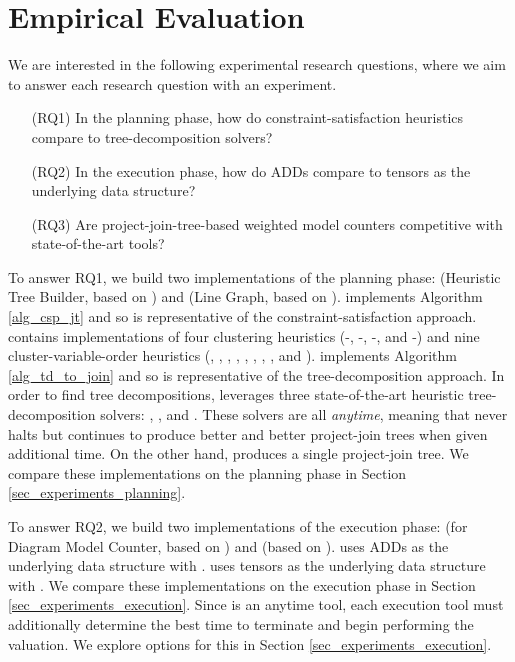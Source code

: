 \section{Empirical Evaluation}
\label{sec_experiments}

We are interested in the following experimental research questions, where we aim to answer each research question with an experiment.
\begin{itemize}
    \item[(RQ1)] In the planning phase, how do constraint-satisfaction heuristics compare to tree-decomposition solvers?
    \item[(RQ2)] In the execution phase, how do ADDs compare to tensors as the underlying data structure?
    \item[(RQ3)] Are project-join-tree-based weighted model counters competitive with state-of-the-art tools?
\end{itemize}

To answer RQ1, we build two implementations of the planning phase: \Htb{} (Heuristic Tree Builder, based on \cite{dudek2020addmc}) and \Lg{} (Line Graph, based on \cite{dudek2019efficient}).
\Htb{} implements Algorithm \ref{alg_csp_jt} and so is representative of the constraint-satisfaction approach.
\Htb{} contains implementations of four clustering heuristics (\Be-\ListH, \Be-\TreeH, \Bm-\ListH, and \Bm-\TreeH) and nine cluster-variable-order heuristics (\Random, \Mcs, \Invmcs, \Lexp, \Invlexp, \Lexm, \Invlexm, \Minfill, and \Invminfill).
\Lg{} implements Algorithm \ref{alg_td_to_join} and so is representative of the tree-decomposition approach.
In order to find tree decompositions, \Lg{} leverages three state-of-the-art heuristic tree-decomposition solvers: \Flowcutter{} \cite{strasser2017computing}, \Htd{} \cite{abseher2017htd}, and \Tamaki{} \cite{tamaki2019positive}.
These solvers are all \emph{anytime}, meaning that \Lg{} never halts but continues to produce better and better project-join trees when given additional time.
On the other hand, \Htb{} produces a single project-join tree.
We compare these implementations on the planning phase in Section \ref{sec_experiments_planning}.

To answer RQ2, we build two implementations of the execution phase: \Dmc{} (for Diagram Model Counter, based on \cite{dudek2020addmc}) and \Tensor{} (based on \cite{dudek2019efficient}).
\Dmc{} uses ADDs as the underlying data structure with \cudd{} \cite{somenzi2015cudd}.
\Tensor{} uses tensors as the underlying data structure with \Numpy{} \cite{numpy}.
We compare these implementations on the execution phase in Section \ref{sec_experiments_execution}.
Since \Lg{} is an anytime tool, each execution tool must additionally determine the best time to terminate \Lg{} and begin performing the valuation.
We explore options for this in Section \ref{sec_experiments_execution}.

